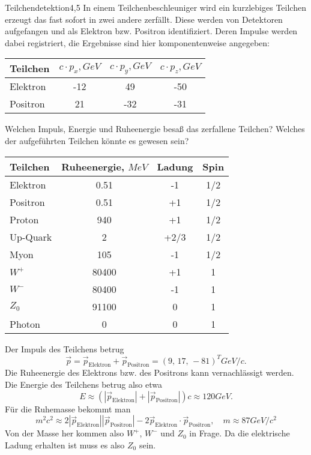 \begin{problem}{Teilchendetektion}{4,5}
In einem Teilchenbeschleuniger wird ein kurzlebiges Teilchen erzeugt das fast sofort in zwei andere zerfällt. Diese werden von Detektoren aufgefangen und als Elektron bzw. Positron identifiziert. Deren Impulse werden dabei registriert, die Ergebnisse sind hier komponentenweise angegeben:
\begin{center}
\begin{tabular}{lccc}
\toprule
Teilchen & $c \cdot p_x, \unit{GeV}$ & $c \cdot p_y, \unit{GeV}$ & $c \cdot p_z, \unit{GeV}$ \\
\midrule
Elektron & -12 & 49 & -50 \\
Positron & 21 & -32 & -31 \\
\bottomrule
\end{tabular}
\end{center}
Welchen Impuls, Energie und Ruheenergie besaß das zerfallene Teilchen? Welches der aufgeführten Teilchen könnte es gewesen sein?
\begin{center}
\begin{tabular}{lccc}
\toprule
Teilchen & Ruheenergie, $\unit{MeV}$ & Ladung & Spin \\
\midrule
Elektron & 0.51 & -1 & 1/2 \\
Positron & 0.51 & +1 & 1/2 \\
Proton & 940 & +1 & 1/2 \\
Up-Quark & 2 & +2/3 & 1/2 \\
Myon & 105 & -1 & 1/2 \\
$W^+$ & 80400 & +1 & 1 \\
$W^-$ & 80400 & -1 & 1 \\
$Z_0$ & 91100 & 0 & 1 \\
Photon & 0 & 0 & 1 \\
\bottomrule
\end{tabular}
\end{center}
\begin{solution}
Der Impuls des Teilchens betrug
\[
\vec p = \vec p_\mathrm{Elektron} + \vec p_\mathrm{Positron} = (9,\, 17,\, -81)^T \unit{GeV}/c.
\]
Die Ruheenergie des Elektrons bzw. des Positrons kann vernachlässigt werden. Die Energie des Teilchens betrug also etwa
\[
E \approx (|\vec p_\mathrm{Elektron}| + |\vec p_\mathrm{Positron}|) c \approx 120 \unit{GeV}.
\]
Für die Ruhemasse bekommt man
\[
m^2 c^2 \approx 2 |\vec p_\mathrm{Elektron}|  |\vec p_\mathrm{Positron}| - 2 \vec p_\mathrm{Elektron} \cdot \vec p_\mathrm{Positron}, \quad m \approx 87 \unit{GeV} / c^2
\]
Von der Masse her kommen also $W^+$, $W^-$ und $Z_0$ in Frage. Da die elektrische Ladung erhalten ist muss es also $Z_0$ sein.
\end{solution}
\end{problem}


